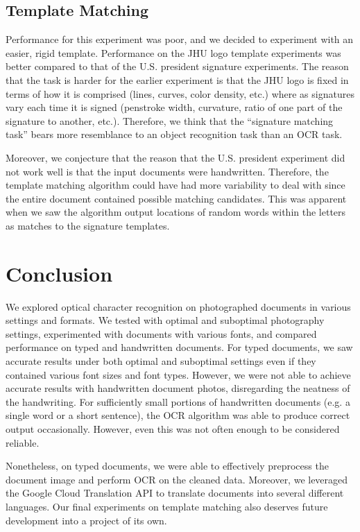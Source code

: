 \documentclass[11pt,letterpaper]{article}
\begin{document}
\subsection{Template Matching}

Performance for this experiment was poor, and we decided to experiment with an easier, rigid template. Performance on the JHU logo template experiments was better compared to that of the U.S. president signature experiments. The reason that the task is harder for the earlier experiment is that the JHU logo is fixed in terms of how it is comprised (lines, curves, color density, etc.) where as signatures vary each time it is signed (penstroke width, curvature, ratio of one part of the signature to another, etc.). Therefore, we think that the ``signature matching task'' bears more resemblance to an object recognition task than an OCR task.

Moreover, we conjecture that the reason that the U.S. president experiment did not work well is that the input documents were handwritten. Therefore, the template matching algorithm could have had more variability to deal with since the entire document contained possible matching candidates. This was apparent when we saw the algorithm output locations of random words within the letters as matches to the signature templates.

\section{Conclusion}

We explored optical character recognition on photographed documents in various settings and formats. We tested with optimal and suboptimal photography settings, experimented with documents with various fonts, and compared performance on typed and handwritten documents. For typed documents, we saw accurate results under both optimal and suboptimal settings even if they contained various font sizes and font types. However, we were not able to achieve accurate results with handwritten document photos, disregarding the neatness of the handwriting. For sufficiently small portions of handwritten documents (e.g. a single word or a short sentence), the OCR algorithm was able to produce correct output occasionally. However, even this was not often enough to be considered reliable. 

Nonetheless, on typed documents, we were able to effectively preprocess the document image and perform OCR on the cleaned data. Moreover, we leveraged the Google Cloud Translation API to translate documents into several different languages. Our final experiments on template matching also deserves future development into a project of its own.
\end{document}
